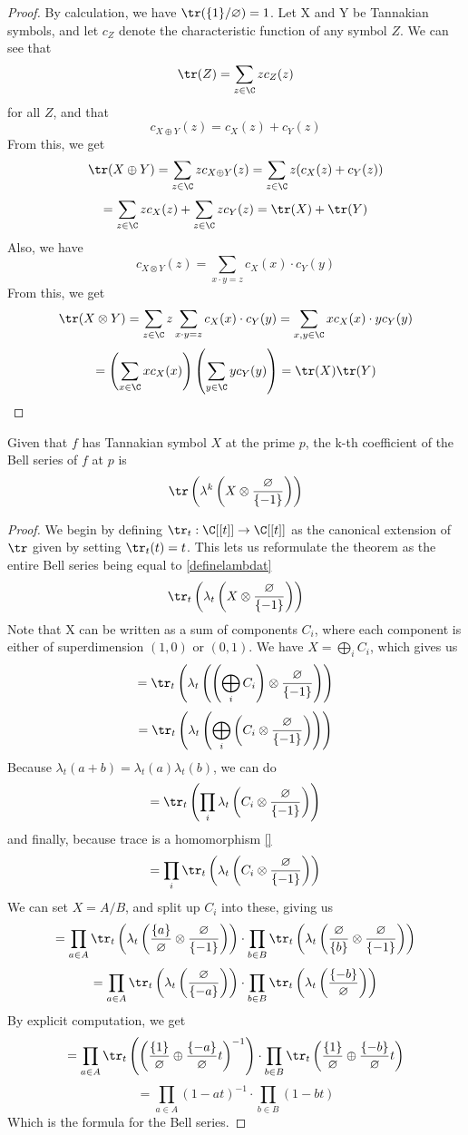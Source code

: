 \documentclass[a4paper]{article}
\begin{document}
\begin{proof}
By calculation, we have $\tr(\{1\}/\varnothing) = 1$. Let X and Y be Tannakian symbols, and let $c_Z$ denote the characteristic function of any symbol $Z$. We can see that 
$$\tr(Z) = \sum_{z \in \C} z c_Z(z)$$
for all $Z$, and that 
$$c_{X \oplus Y}(z) = c_X(z) + c_Y(z)$$
From this, we get
$$\tr(X \oplus Y) = \sum_{z \in \C} z c_{X \oplus Y}(z) = \sum_{z \in \C} z (c_X(z) + c_Y(z)) $$
$$ = \sum_{z \in \C} z c_X(z) + \sum_{z \in \C} z c_Y(z) = \tr(X) + \tr(Y)$$
Also, we have 
$$c_{X \otimes Y}(z) = \sum_{x \cdot y=z} c_X(x) \cdot c_Y(y)$$
From this, we get
$$\tr(X \otimes Y) = \sum_{z \in \C} z \sum_{x \cdot y=z}c_X(x) \cdot c_Y(y) = \sum_{x, y \in \C} x c_X(x) \cdot y c_Y(y) $$
$$=\left(\sum_{x \in \C} x c_X(x)\right)\left(\sum_{y \in \C} y c_Y(y)\right) = \tr(X)\tr(Y)$$
\end{proof}

\begin{theorem}
Given that $f$ has Tannakian symbol $X$ at the prime $p$, the k-th coefficient of the Bell series of $f$ at $p$ is
$$\tr\left(\lambda^{k}\left(X \otimes \frac{\varnothing}{\{-1\}}\right)\right)$$
\end{theorem}

\begin{proof}
We begin by defining $\tr_t : \C[[t]] \to \C[[t]]$ as the canonical extension of $\tr$ given by setting $\tr_t(t) = t$. This lets us reformulate the theorem as the entire Bell series being equal to \ref{definelambdat}
$$\tr_t\left(\lambda_t\left(X \otimes \frac{\varnothing}{\{-1\}}\right)\right)$$ 
Note that X can be written as a sum of components $C_i$, where each component is either of superdimension $(1, 0)$ or $(0, 1)$. We have $X = \bigoplus_i C_i$, which gives us
$$=\tr_t\left(\lambda_t\left(\left(\bigoplus_i C_i\right) \otimes \frac{\varnothing}{\{-1\}}\right)\right)$$ 
$$=\tr_t\left(\lambda_t\left(\bigoplus_i \left(C_i \otimes \frac{\varnothing}{\{-1\}}\right)\right)\right)$$ 
Because $\lambda_t(a + b) = \lambda_t(a)\lambda_t(b)$, we can do
$$=\tr_t\left(\prod_i\lambda_t\left(C_i \otimes \frac{\varnothing}{\{-1\}}\right)\right)$$ 
and finally, because trace is a homomorphism \ref{}
$$=\prod_i\tr_t\left(\lambda_t\left(C_i \otimes \frac{\varnothing}{\{-1\}}\right)\right)$$ 
We can set $X = A/B$, and split up $C_i$ into these, giving us 
$$=\prod_{a \in A}\tr_t\left(\lambda_t\left(\frac{\{a\}}{\varnothing} \otimes \frac{\varnothing}{\{-1\}}\right)\right) \cdot \prod_{b \in B}\tr_t\left(\lambda_t\left(\frac{\varnothing}{\{b\}} \otimes \frac{\varnothing}{\{-1\}}\right)\right)$$
$$=\prod_{a \in A}\tr_t\left(\lambda_t\left(\frac{\varnothing}{\{-a\}}\right)\right) \cdot \prod_{b \in B}\tr_t\left(\lambda_t\left(\frac{\{-b\}}{\varnothing}\right)\right)$$
By explicit computation, we get 
$$=\prod_{a \in A}\tr_t\left(\left(\frac{\{1\}}{\varnothing} \oplus \frac{\{-a\}}{\varnothing}t\right)^{-1}\right) \cdot \prod_{b \in B}\tr_t\left(\frac{\{1\}}{\varnothing} \oplus \frac{\{-b\}}{\varnothing}t\right)$$
$$=\prod_{a \in A}\left(1 - at\right)^{-1} \cdot \prod_{b \in B}\left(1 - bt\right)$$
Which is the formula for the Bell series.
\end{proof}
\end{document}
